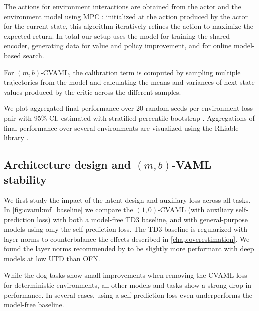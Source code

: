 The actions for environment interactions are obtained from the actor and the environment model using MPC \cite{hansen2022temporal}: initialized at the action produced by the actor for the current state, this algorithm iteratively refines the action to maximize the expected return.
In total our setup uses the model for training the shared encoder, generating data for value and policy improvement, and for online model-based search.

For $(m,b)$-CVAML, the calibration term is computed by sampling multiple trajectories from the model and calculating the means and variances of next-state values produced by the critic across the different samples.

We plot aggregated final performance over 20 random seeds per environment-loss pair with 95\% CI,  estimated with stratified percentile bootstrap \parencite{patterson2024empirical}.
Aggregations of final performance over several environments are visualized using the RLiable library \parencite{agarwal2021deep}.

\subsection{Architecture design and $(m,b)$-VAML stability}

We first study the impact of the latent design and auxiliary loss across all tasks.
In \autoref{fig:cvaml:mf_baseline} we compare the $(1,0)$-CVAML (with auxiliary self-prediction loss) with both a model-free TD3 baseline, and with general-purpose models using only the self-prediction loss.
The TD3 baseline is regularized with layer norms to counterbalance the effects described in \autoref{chap:overestimation}.
We found the layer norms recommended by \textcite{hansen2024tdmpc} to be slightly more performant with deep models at low UTD than OFN.

While the dog tasks show small improvements when removing the CVAML loss for deterministic environments, all other models and tasks show a strong drop in performance.
In several cases, using a self-prediction loss even underperforms the model-free baseline.

